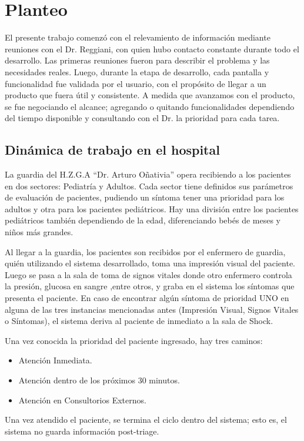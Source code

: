 \section{Planteo}

El presente trabajo comenzó con el relevamiento de información mediante reuniones con el Dr. Reggiani, con quien hubo contacto constante durante todo el desarrollo. Las primeras reuniones fueron para describir el problema y las necesidades reales. Luego, durante la etapa de desarrollo, cada pantalla y funcionalidad fue validada por el usuario, con el propósito de llegar a un producto que fuera útil y consistente. A medida que avanzamos con el producto, se fue negociando el alcance; agregando o quitando funcionalidades dependiendo del tiempo disponible y consultando con el Dr. la prioridad para cada tarea.


\subsection{Dinámica de trabajo en el hospital}
La guardia del H.Z.G.A ``Dr. Arturo Oñativia'' opera recibiendo a los pacientes en dos sectores: Pediatría y Adultos. Cada sector tiene definidos sus parámetros de evaluación de pacientes, pudiendo un síntoma tener una prioridad para los adultos y otra para los pacientes pediátricos. Hay una división entre los pacientes pediátricos también dependiendo de la edad, diferenciando bebés de meses y niños más grandes.

Al llegar a la guardia, los pacientes son recibidos por el enfermero de guardia, quién utilizando el sistema desarrollado, toma una impresión visual del paciente. Luego se pasa a la sala de toma de signos vitales donde otro enfermero controla la presión, glucosa en sangre ,entre otros, y graba en el sistema los síntomas que presenta el paciente. En caso de encontrar algún síntoma de prioridad UNO en alguna de las tres instancias mencionadas antes (Impresión Visual, Signos Vitales o Síntomas), el sistema deriva al paciente de inmediato a la sala de Shock.  

Una vez conocida la prioridad del paciente ingresado, hay tres caminos: 
\begin{itemize}
\item Atención Inmediata.
\item Atención dentro de los próximos 30 minutos. 
\item Atención en Consultorios Externos.
\end{itemize}
Una vez atendido el paciente, se termina el ciclo dentro del sistema; esto es, el sistema no guarda información post-triage. 



